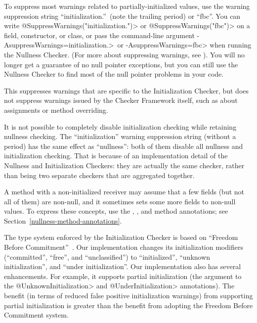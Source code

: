 
To suppress most warnings related to partially-initialized values, use the
warning suppression string ``initialization.''~(note the trailing period)
or ``fbc''.  You can write \<@SuppressWarnings("initialization.")> or
\<@SuppressWarnings("fbc")> on a field, constructor, or
class, or pass the command-line argument
\<-AsuppressWarnings=initialization.>~or \<-AsuppressWarnings=fbc> when
running the Nullness Checker.
(For more about suppressing warnings, see
).  You will no longer get a guarantee
of no null pointer exceptions, but you can still use the Nullness Checker
to find most of the null pointer problems in your code.

This suppresses warnings that are specific to the Initialization Checker,
but does not suppress warnings issued by the Checker Framework itself, such
as about assignments or method overriding.

It is not possible to completely disable initialization checking while
retaining nullness checking.  The ``initialization'' warning suppression
string (without a period) has the same effect as ``nullness'':  both
of them disable all nullness and initialization checking.  That is because
of an implementation detail of the Nullness and Initialization Checkers:
they are actually the same checker, rather than being two separate checkers
that are aggregated together.





A method with a non-initialized receiver may assume that a few fields (but not all
of them) are non-null, and it sometimes sets some more fields to non-null
values.  To express these concepts, use the
,
, and
 method annotations;
see Section~\ref{nullness-method-annotations}.



The type system enforced by the Initialization Checker is based on
``Freedom Before Commitment''~\cite{SummersM2011}.  Our implementation
changes its initialization modifiers (``committed'', ``free'', and
``unclassified'') to ``initialized'', ``unknown initialization'', and
``under initialization''.  Our implementation also has several
enhancements.  For example, it supports partial initialization (the
argument to the \<@UnknownInitialization> and \<@UnderInitialization>
annotations).  The benefit (in terms of reduced false positive
initialization warnings) from supporting partial initialization is
greater than the benefit from adopting the Freedom Before Commitment system.



